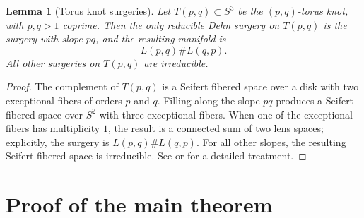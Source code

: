 \documentclass[11pt]{article}
\newtheorem{lemma}[theorem]{Lemma}
\begin{document}
\begin{lemma}[Torus knot surgeries]\label{lem:torus}
Let \(T(p,q) \subset S^3\) be the \((p,q)\)-torus knot, with \(p,q>1\) coprime. Then the only reducible Dehn surgery on \(T(p,q)\) is the surgery with slope \(pq\), and the resulting manifold is
\[
L(p,q) \# L(q,p).
\]
All other surgeries on \(T(p,q)\) are irreducible.
\end{lemma}

\begin{proof}
The complement of \(T(p,q)\) is a Seifert fibered space over a disk with two exceptional fibers of orders \(p\) and \(q\). Filling along the slope \(pq\) produces a Seifert fibered space over \(S^2\) with three exceptional fibers. When one of the exceptional fibers has multiplicity \(1\), the result is a connected sum of two lens spaces; explicitly, the surgery is \(L(p,q) \# L(q,p)\). For all other slopes, the resulting Seifert fibered space is irreducible. See \cite[Chapter 2]{BoyerGordonWatson2013} or \cite[Section 3]{GL1996} for a detailed treatment.
\end{proof}

\section{Proof of the main theorem}
\end{document}
